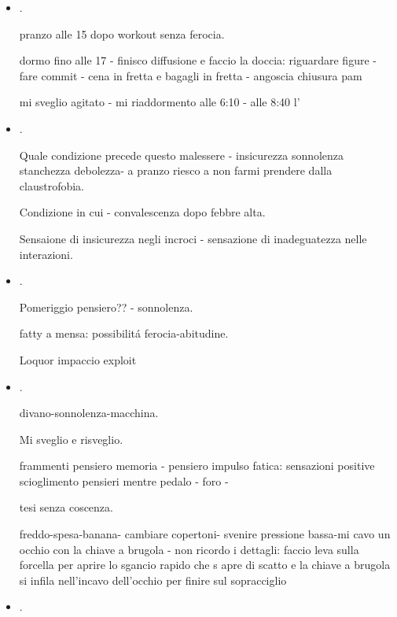 \begin{itemize}
\item {}.


pranzo alle 15 dopo workout senza ferocia.

dormo fino alle 17 - finisco diffusione e faccio la doccia: riguardare figure - fare commit - cena in fretta e bagagli in fretta - angoscia chiusura pam

mi sveglio agitato - mi riaddormento alle 6:10 - alle 8:40 l'

\item {}.

Quale condizione precede questo malessere - insicurezza sonnolenza stanchezza debolezza- a pranzo riesco a non farmi prendere dalla claustrofobia.

Condizione in cui  - convalescenza dopo febbre alta.

Sensaione di insicurezza negli incroci - sensazione di inadeguatezza nelle interazioni.

\item {}.

Pomeriggio pensiero?? - sonnolenza.

fatty a mensa: possibilit\'a ferocia-abitudine.

Loquor impaccio exploit 

\item {}.

divano-sonnolenza-macchina.

Mi sveglio e risveglio.

frammenti pensiero memoria - pensiero impulso fatica: sensazioni positive scioglimento pensieri mentre pedalo - foro - 

tesi senza coscenza.

freddo-spesa-banana- cambiare copertoni- svenire pressione bassa-mi cavo un occhio con la chiave a brugola - non ricordo i dettagli: faccio leva sulla forcella per aprire lo sgancio rapido che s apre di scatto e la chiave a brugola si infila nell'incavo dell'occhio per finire sul sopracciglio

\item {}.


\end{itemize}
